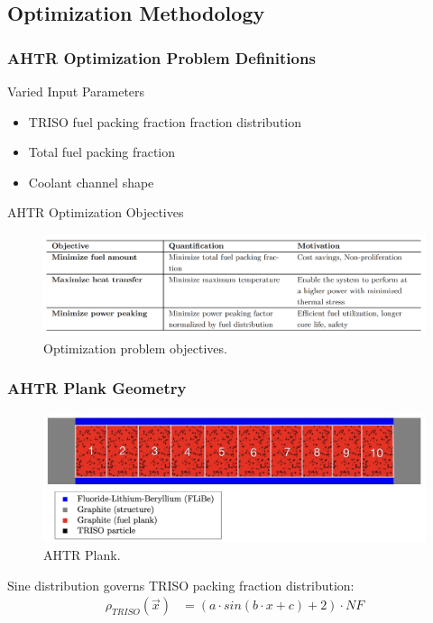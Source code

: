 \subsection{Optimization Methodology}
\begin{frame}
    \frametitle{AHTR Optimization Problem Definitions}
    \begin{block}{Varied Input Parameters}
        \begin{itemize}
            \item TRISO fuel packing fraction fraction distribution 
            \item Total fuel packing fraction 
            \item Coolant channel shape 
        \end{itemize}
    \end{block}
    \begin{block}{AHTR Optimization Objectives}
        \begin{figure}
            \includegraphics[width=0.9\linewidth]{figures/ahtr-opt-obj.png} 
            \caption{Optimization problem objectives.}
        \end{figure}
    \end{block}
\end{frame}

\begin{frame}
    \frametitle{AHTR Plank Geometry}
    \begin{figure}
        \includegraphics[width=0.9\linewidth]{figures/straightened-plank-pres.png} 
        \caption{AHTR Plank.}
    \end{figure}
    Sine distribution governs TRISO packing fraction distribution: 
    \begin{align}
        \rho_{TRISO}(\vec{x}) &= \left(a\cdot sin(b\cdot x + c) + 2\right) \cdot NF
    \end{align}
\end{frame}

